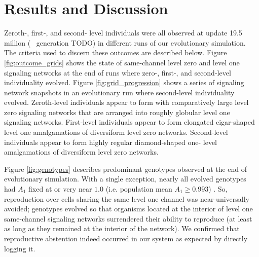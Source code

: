 \section{Results and Discussion}













Zeroth-, first-, and second- level individuals were all observed at update 19.5 million (~ generation TODO) in different runs of our evolutionary simulation.
The criteria used to discern these outcomes are described below.
Figure \ref{fig:outcome_grids} shows the state of same-channel level zero and level one signaling networks at the end of runs where zero-, first-, and second-level individuality evolved.
Figure \ref{fig:grid_progression} shows a series of signaling network snapshots in an evolutionary run where second-level individuality evolved.
Zeroth-level individuals appear to form with comparatively large level zero signaling networks that are arranged into roughly globular level one signaling networks.
First-level individuals appear to form elongated cigar-shaped level one amalgamations of diversiform level zero networks.
Second-level individuals appear to form highly regular diamond-shaped one- level amalgamations of diversiform level zero networks.

Figure \ref{fig:genotypes} describes predominant genotypes observed at the end of evolutionary simulation.
With a single exception, nearly all evolved genotypes had $A_1$ fixed at or very near $1.0$ (i.e. population mean $A_1 \geq 0.993$) .
So, reproduction over cells sharing the same level one channel was near-universally avoided;
genotypes evolved so that organisms located at the interior of level one same-channel signaling networks surrendered their ability to reproduce (at least as long as they remained at the interior of the network).
We confirmed that reproductive abstention indeed occurred in our system as expected by directly logging it.

